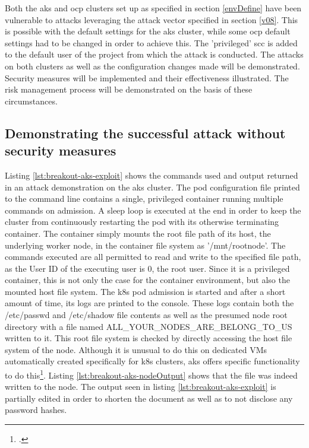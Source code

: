 Both the \gls{aks} and \gls{ocp} clusters set up as specified in section \ref{envDefine} have been vulnerable to attacks leveraging the attack vector specified in section \ref{v08}. This is possible with the default settings for the \gls{aks} cluster, while some \gls{ocp} default settings had to be changed in order to achieve this.
The 'privileged' \gls{scc} is added to the default user of the project from which the attack is conducted.
The attacks on both clusters as well as the configuration changes made will be demonstrated. Security measures will be implemented and their effectiveness illustrated. The risk management process will be demonstrated on the basis of these circumstances.

\subsection{Demonstrating the successful attack without security measures} \label{v08attack}
Listing \ref{lst:breakout-aks-exploit} shows the commands used and output returned in an attack demonstration on the \gls{aks} cluster.
The pod configuration file printed to the command line contains a single, privileged container running multiple commands on admission.
A sleep loop is executed at the end in order to keep the cluster from continuously restarting the pod with its otherwise terminating container.
The container simply mounts the root file path of its host, the underlying worker node, in the container file system as '/mnt/rootnode'. 
The commands executed are all permitted to read and write to the specified file path, as the User ID of the executing user is 0, the root user. Since it is a privileged container, this is not only the case for the container environment, but also the mounted host file system.
The \gls{k8s} pod admission is started and after a short amount of time, its logs are printed to the console. 
These logs contain both the {\slash}etc{\slash}passwd and {\slash}etc{\slash}shadow file contents as well as the presumed node root directory with a file named ALL{\_}YOUR{\_}NODES{\_}ARE{\_}BELONG{\_}TO{\_}US written to it.
This root file system is checked by directly accessing the host file system of the node. Although it is unusual to do this on dedicated VMs automatically created specifically for \gls{k8s} clusters, \gls{aks} offers specific functionality to do this\footcite{aksNodeSsh}. Listing \ref{lst:breakout-aks-nodeOutput} shows that the file was indeed written to the node.
The output seen in listing \ref{lst:breakout-aks-exploit} is partially edited in order to shorten the document as well as to not disclose any password hashes.

